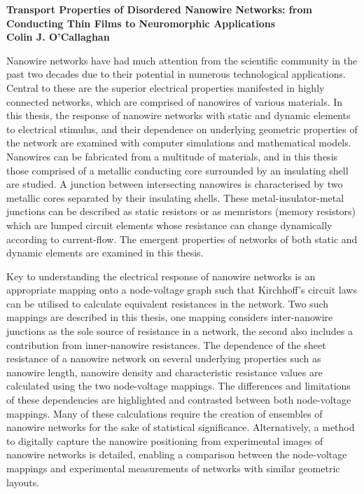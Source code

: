 \documentclass[
		numbers=noenddot,headinclude=rue,%
                footinclude=true,cleardoublepage=empty,
                BCOR=5mm,paper=a4,fontsize=12pt, %
                ngerman,american, %
                ]{scrreprt}
\begin{document}
\begin{center}
\large{\textbf{Transport Properties of Disordered Nanowire Networks: from Conducting Thin Films to Neuromorphic Applications}}\\ %
\textbf{Colin J. O'Callaghan}
\end{center}
Nanowire networks have had much attention from the scientific community in the past two decades due to their potential in numerous technological applications. Central to these are the superior electrical properties manifested in highly connected networks, which are comprised of nanowires of various materials. In this thesis, the response of nanowire networks with static and dynamic elements to electrical stimulus, and their dependence on underlying geometric properties of the network are examined with computer simulations and mathematical models. Nanowires can be fabricated from a multitude of materials, and in this thesis those comprised of a metallic conducting core surrounded by an insulating shell are studied. A junction between intersecting nanowires is characterised by two metallic cores separated by their insulating shells. These metal-insulator-metal junctions can be described as static resistors or as memristors (memory resistors) which are lumped circuit elements whose resistance can change dynamically according to current-flow. The emergent properties of networks of both static and dynamic elements are examined in this thesis.

Key to understanding the electrical response of nanowire networks is an appropriate mapping onto a node-voltage graph such that Kirchhoff's circuit laws can be utilised to calculate equivalent resistances in the network. Two such mappings are described in this thesis, one mapping considers inter-nanowire junctions as the sole source of resistance in a network, the second also includes a contribution from inner-nanowire resistances. The dependence of the sheet resistance of a nanowire network on several underlying properties such as nanowire length, nanowire density and characteristic resistance values are calculated using the two node-voltage mappings. The differences and limitations of these dependencies are highlighted and contrasted between both node-voltage mappings. Many of these calculations require the creation of ensembles of nanowire networks for the sake of statistical significance. Alternatively, a method to digitally capture the nanowire positioning from experimental images of nanowire networks is detailed, enabling a comparison between the node-voltage mappings and experimental measurements of networks with similar geometric layouts. 
\end{document}
